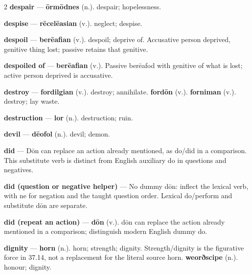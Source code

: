 \begin{multicols}{2}
\textbf{despair} — \textbf{ōrmōdnes} (n.). despair; hopelessness.\par
\textbf{despise} — \textbf{rēcelēasian} (v.). neglect; despise.\par
\textbf{despoil} — \textbf{berēafian} (v.). despoil; deprive of. Accusative person deprived, genitive thing lost; passive retains that genitive.\par
\textbf{despoiled of} — \textbf{berēafian} (v.). Passive berēafod with genitive of what is lost; active person deprived is accusative.\par
\textbf{destroy} — \textbf{fordilgian} (v.). destroy; annihilate. \textbf{fordōn} (v.).  \textbf{forniman} (v.). destroy; lay waste.\par
\textbf{destruction} — \textbf{lor} (n.). destruction; ruin.\par
\textbf{devil} — \textbf{dēofol} (n.). devil; demon.\par
\textbf{did} — Dōn can replace an action already mentioned, as do/did in a comparison. This substitute verb is distinct from English auxiliary do in questions and negatives.\par
\textbf{did (question or negative helper)} — No dummy dōn: inflect the lexical verb, with ne for negation and the taught question order. Lexical do/perform and substitute dōn are separate.\par
\textbf{did (repeat an action)} — \textbf{dōn} (v.). dōn can replace the action already mentioned in a comparison; distinguish modern English dummy do.\par
\textbf{dignity} — \textbf{horn} (n.). horn; strength; dignity. Strength/dignity is the figurative force in 37.14, not a replacement for the literal source horn. \textbf{weorðscipe} (n.). honour; dignity.\par

\end{multicols}
